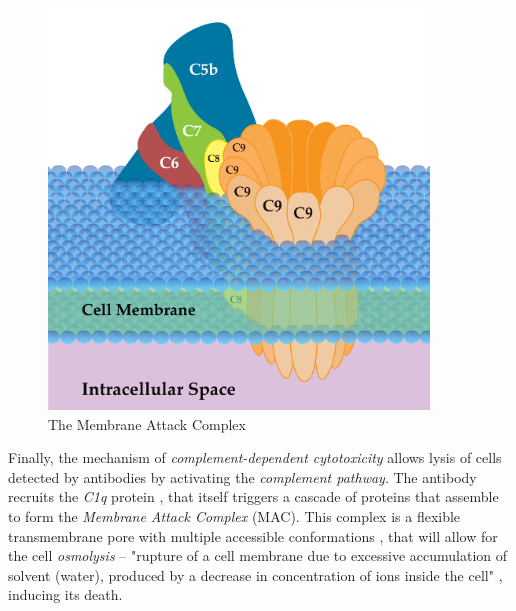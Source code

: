 \begin{figure}[H]
\begin{minipage}{0.49\textwidth}
        \includegraphics[width=0.9\textwidth]{../Images/Membrane_Attack_Complex.png}   
        \caption{The Membrane Attack Complex}
        \label{fig:MAC}
    \end{minipage}
\end{figure}

Finally, the mechanism of \emph{complement-dependent cytotoxicity} allows
lysis of cells detected by antibodies by activating the \emph{complement pathway}.
The antibody recruits the \emph{C1q} protein \cite{charles_a_janeway_complement_2001}
\cite{courtois_complement_2012}, that itself triggers a cascade
of proteins that assemble to form the \emph{Membrane Attack Complex} (MAC).
This complex is a flexible transmembrane pore with multiple 
accessible conformations \cite{xie_complement_2020},
that will allow for the cell \emph{osmolysis} -- "rupture of a cell membrane
due to excessive accumulation of solvent (water), produced by
a decrease in concentration of ions inside the cell" \cite{gebhart_osmolysis_2013},
inducing its death.


